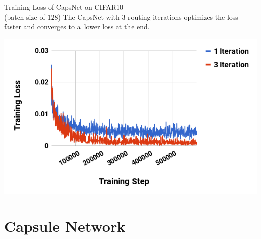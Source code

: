 \documentclass{beamer}
\begin{document}
{    \begin{frame}{Training Loss of CapsNet on CIFAR10 \\
        \tiny (batch size of $128$)}
      The CapsNet with \alert{$3$ routing iterations} optimizes the loss faster and converges to a~lower loss at the end.
      \pause

      \begin{center}
        \includegraphics[width=.9\textwidth]{../img/cifar}
      \end{center}
      \pause
    \end{frame}
  }


  \section{Capsule Network}
\end{document}

